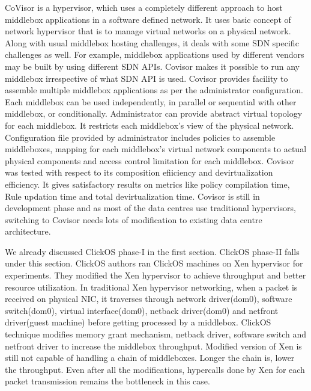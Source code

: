 \documentclass[a4paper,11pt]{report}
\begin{document}
CoVisor\cite{188954} is a hypervisor, which uses a completely different approach to host middlebox applications in a software defined network. It uses basic concept of network hypervisor that is to manage virtual networks on a physical network. Along with usual middlebox hosting challenges, it deals with some SDN specific challenges as well. For example, middlebox applications used by different vendors may be built by using different SDN APIs. Covisor makes it possible to run any middlebox irrespective of what SDN API is used. Covisor provides facility to assemble multiple middlebox applications as per the administrator configuration. Each middlebox can be used independently, in parallel or sequential with other middlebox, or conditionally. Administrator can provide abstract virtual topology for each middlebox. It restricts each middlebox's view of the physical network. Configuration file provided by administrator includes policies to assemble middleboxes, mapping for each middlebox's virtual network components to actual physical components and access control limitation for each middlebox. Covisor was tested with respect to its composition efiiciency and devirtualization efficiency. It gives satisfactory results on metrics like policy compilation time, Rule updation time and total devirtualization time. Covisor is still in development phase and as most of the data centres use traditional hypervisors, switching to Covisor needs lots of modification to existing data centre architecture. 

We already discussed ClickOS\cite{179771} phase-I in the first section. ClickOS phase-II falls under this section. ClickOS authors ran ClickOS machines on Xen hypervisor for experiments. They modified the Xen hypervisor to achieve throughput and better resource utilization. In traditional Xen hypervisor networking, when a packet is received on physical NIC, it traverses through network driver(dom0), software switch(dom0), virtual interface(dom0), netback driver(dom0) and netfront driver(guest machine) before getting processed by a middlebox. ClickOS technique modifies memory grant mechanism, netback driver, software switch and netfront driver to increase the middlebox throughput. Modified version of Xen is still not capable of handling a chain of middleboxes. Longer the chain is, lower the throughput. Even after all the modifications, hypercalls done by Xen for each packet transmission remains the bottleneck in this case.            
\end{document}
